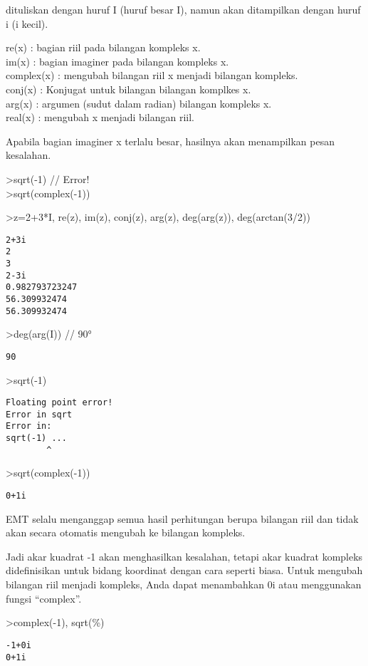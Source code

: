 \documentclass[
]{book}
\begin{document}
dituliskan dengan huruf I (huruf besar I), namun akan ditampilkan dengan huruf i (i kecil).

re(x) : bagian riil pada bilangan kompleks x.\\
im(x) : bagian imaginer pada bilangan kompleks x.\\
complex(x) : mengubah bilangan riil x menjadi bilangan kompleks.\\
conj(x) : Konjugat untuk bilangan bilangan komplkes x.\\
arg(x) : argumen (sudut dalam radian) bilangan kompleks x.\\
real(x) : mengubah x menjadi bilangan riil.

Apabila bagian imaginer x terlalu besar, hasilnya akan menampilkan pesan kesalahan.

\textgreater sqrt(-1) // Error!\\
\textgreater sqrt(complex(-1))

\textgreater z=2+3*I, re(z), im(z), conj(z), arg(z), deg(arg(z)), deg(arctan(3/2))

\begin{verbatim}
2+3i
2
3
2-3i
0.982793723247
56.309932474
56.309932474
\end{verbatim}

\textgreater deg(arg(I)) // 90°

\begin{verbatim}
90
\end{verbatim}

\textgreater sqrt(-1)

\begin{verbatim}
Floating point error!
Error in sqrt
Error in:
sqrt(-1) ...
        ^
\end{verbatim}

\textgreater sqrt(complex(-1))

\begin{verbatim}
0+1i
\end{verbatim}

EMT selalu menganggap semua hasil perhitungan berupa bilangan riil dan tidak akan secara otomatis mengubah ke bilangan kompleks.

Jadi akar kuadrat -1 akan menghasilkan kesalahan, tetapi akar kuadrat kompleks didefinisikan untuk bidang koordinat dengan cara seperti biasa. Untuk mengubah bilangan riil menjadi kompleks, Anda dapat menambahkan 0i atau menggunakan fungsi ``complex''.

\textgreater complex(-1), sqrt(\%)

\begin{verbatim}
-1+0i 
0+1i
\end{verbatim}
\end{document}
